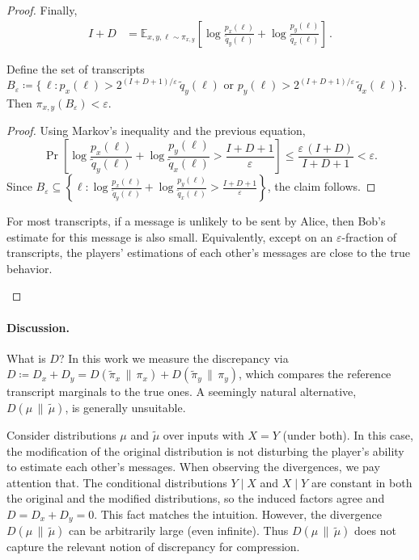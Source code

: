 \documentclass[11pt]{article}
\begin{document}
\begin{proof}
Finally,
\begin{align*}
    I + D 
    &= \mathbb{E}_{x,y,\ell \sim \pi_{x,y}} 
    \left[
       \log \frac{p_x(\ell)}{\tilde{q}_y(\ell)}
       + \log \frac{p_y(\ell)}{\tilde{q}_x(\ell)}
    \right] \,.
\end{align*}

\begin{lemma}
Define the set of transcripts $B_{\varepsilon} \coloneqq \{ \, \ell : p_x(\ell) > 2^{(I+D+1)/\varepsilon} \, \tilde{q}_y(\ell) \text{ or } p_y(\ell) > 2^{(I+D+1)/\varepsilon} \, \tilde{q}_x(\ell) \}$. Then $\pi_{x,y}(B_{\varepsilon}) < \varepsilon$.
\end{lemma}

\begin{proof}
   Using Markov's inequality and the previous equation,
   \[
     \Pr\!\left[ \log \frac{p_x(\ell)}{\tilde{q}_y(\ell)}
     + \log \frac{p_y(\ell)}{\tilde{q}_x(\ell)} > \frac{I + D + 1}{\varepsilon} \right]
     \le \frac{\varepsilon \, (I + D)}{I + D + 1}
     < \varepsilon.
   \]
   Since $B_{\varepsilon} \subseteq \left\{ \ell : \log \frac{p_x(\ell)}{\tilde{q}_y(\ell)} + \log \frac{p_y(\ell)}{\tilde{q}_x(\ell)} > \tfrac{I + D + 1}{\varepsilon} \right\}$, the claim follows.
\end{proof}

\begin{remark}
For most transcripts, if a message is unlikely to be sent by Alice, then Bob's estimate for this message is also small. Equivalently, except on an $\varepsilon$-fraction of transcripts, the players' estimations of each other's messages are close to the true behavior.
\end{remark}
\end{proof}

\paragraph{Discussion.}
What is $D$? In this work we measure the discrepancy via
$D \coloneqq D_x + D_y = D(\tilde{\pi}_x\,\|\,\pi_x) + D(\tilde{\pi}_y\,\|\,\pi_y)$,
which compares the reference transcript marginals to the true ones. A seemingly natural alternative, $D(\mu\,\|\,\tilde{\mu})$, is generally unsuitable.

\begin{example}
Consider distributions $\mu$ and $\tilde{\mu}$ over inputs with $X=Y$  (under both). 
In this case, the modification of the original distribution is not disturbing the player's ability to estimate each other's messages.
When observing the divergences, we pay attention that.
The conditional distributions $Y\mid X$ and $X\mid Y$ are constant in both the original and the modified distributions, so the induced factors agree and $D = D_x + D_y = 0$.
This fact matches the intuition.
However, the divergence $D(\mu\,\|\,\tilde{\mu})$ can be arbitrarily large (even infinite). Thus $D(\mu\,\|\,\tilde{\mu})$ does not capture the relevant notion of discrepancy for compression.
\end{example}



\end{document}
